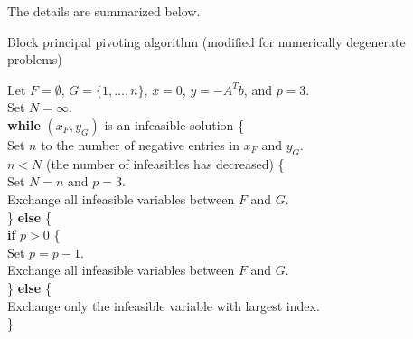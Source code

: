 \documentclass[onecolumn,12pt,tightenlines,amsmath,secnumarabic,%
    floatfix,amssymb,aps,nofootinbib,letterpaper, showkeys]{revtex4}
\begin{document}
The details are summarized below.

\begin{center}
Block principal pivoting algorithm (modified for numerically degenerate problems)\\
\bigskip

\begin{minipage}{6.5in}
\begin{tabbing}
Let $F = \emptyset$, $G = \{1, \dots, n\}$, $x = 0$, $y = -A^T b$, and $p = 3$. \\
Set $N = \infty$.\\
{\bf while} $(x_F,y_G)$ is an infeasible solution \{ \\
\hspace*{1em}Set $n$ to the number of negative entries in $x_F$ and $y_G$.\\
\hspace*{1em}{\bf if} $n < N$ (the number of infeasibles has decreased) \{ \\
\hspace*{1em}\hspace*{1em}Set $N = n$ and $p = 3$.\\
\hspace*{1em}\hspace*{1em}Exchange all infeasible variables between $F$ and $G$.\\
\hspace*{1em}\} {\bf else} \{\\
\hspace*{1em}\hspace*{1em} {\bf if} $p > 0$ \{ \\
\hspace*{1em}\hspace*{1em}\hspace*{1em}Set $p = p - 1$.\\
\hspace*{1em}\hspace*{1em}\hspace*{1em}Exchange all infeasible variables between $F$ and $G$.\\
\hspace*{1em}\hspace*{1em}\} {\bf else} \{ \\
\hspace*{1em}\hspace*{1em}\hspace*{1em}Exchange only the infeasible variable with largest index.\\
\hspace*{1em}\hspace*{1em}\} \\

\end{tabbing}
\end{minipage}
\end{center}
\end{document}

